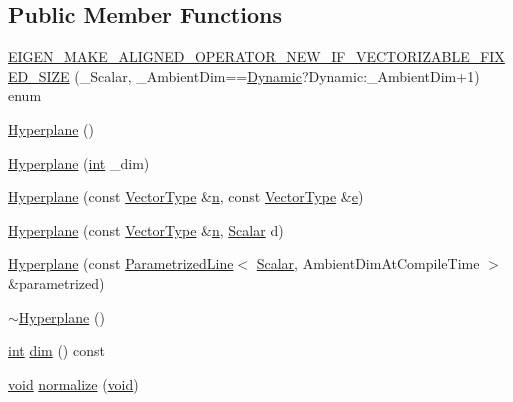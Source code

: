 \subsection*{Public Member Functions}
\begin{DoxyCompactItemize}
\item 
\hyperlink{class_hyperplane_ac7a6ef7e911a9f850f0edc2307bae25b}{E\-I\-G\-E\-N\-\_\-\-M\-A\-K\-E\-\_\-\-A\-L\-I\-G\-N\-E\-D\-\_\-\-O\-P\-E\-R\-A\-T\-O\-R\-\_\-\-N\-E\-W\-\_\-\-I\-F\-\_\-\-V\-E\-C\-T\-O\-R\-I\-Z\-A\-B\-L\-E\-\_\-\-F\-I\-X\-E\-D\-\_\-\-S\-I\-Z\-E} (\-\_\-\-Scalar, \-\_\-\-Ambient\-Dim==\hyperlink{_constants_8h_adc9da5be31bdce40c25a92c27999c0e3}{Dynamic}?Dynamic\-:\-\_\-\-Ambient\-Dim+1) enum
\item 
\hyperlink{class_hyperplane_a92cf06e96f6c7d3c4da0b3c637407bb1}{Hyperplane} ()
\item 
\hyperlink{class_hyperplane_a2dcce9a134371ce9b837c56096772fdd}{Hyperplane} (\hyperlink{ioapi_8h_a787fa3cf048117ba7123753c1e74fcd6}{int} \-\_\-dim)
\item 
\hyperlink{class_hyperplane_a7584d7ea2fdd14e36040ae5839bba88b}{Hyperplane} (const \hyperlink{class_hyperplane_ae700a24e287a31cece3618e1e1bc6385}{Vector\-Type} \&\hyperlink{glext_8h_a4eacae1d9e7c39f8236bb36d4ececa77}{n}, const \hyperlink{class_hyperplane_ae700a24e287a31cece3618e1e1bc6385}{Vector\-Type} \&\hyperlink{_o_p_plots_8m_a9425be9aab51621e317ba7ade564b570}{e})
\item 
\hyperlink{class_hyperplane_a1e1283aa2ef6e196fa4d58a7259a72db}{Hyperplane} (const \hyperlink{class_hyperplane_ae700a24e287a31cece3618e1e1bc6385}{Vector\-Type} \&\hyperlink{glext_8h_a4eacae1d9e7c39f8236bb36d4ececa77}{n}, \hyperlink{class_hyperplane_a7aa8093dff10cabfce189f280fb14069}{Scalar} d)
\item 
\hyperlink{class_hyperplane_aba4d93992906244aabb5ed90f1d02f18}{Hyperplane} (const \hyperlink{class_parametrized_line}{Parametrized\-Line}$<$ \hyperlink{class_hyperplane_a7aa8093dff10cabfce189f280fb14069}{Scalar}, Ambient\-Dim\-At\-Compile\-Time $>$ \&parametrized)
\item 
\hyperlink{class_hyperplane_ab4998afde3d7ec9157b12bb63edfed93}{$\sim$\-Hyperplane} ()
\item 
\hyperlink{ioapi_8h_a787fa3cf048117ba7123753c1e74fcd6}{int} \hyperlink{class_hyperplane_ab49ca50e4edea1011a0b7e4dd8a36275}{dim} () const 
\item 
\hyperlink{group___u_a_v_objects_plugin_ga444cf2ff3f0ecbe028adce838d373f5c}{void} \hyperlink{class_hyperplane_af068590a97c05b81d73dea0dd28be2f6}{normalize} (\hyperlink{group___u_a_v_objects_plugin_ga444cf2ff3f0ecbe028adce838d373f5c}{void})

\end{DoxyCompactItemize}
